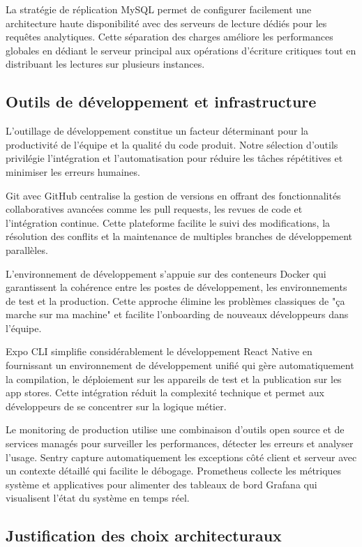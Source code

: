 La stratégie de réplication MySQL permet de configurer facilement une architecture haute disponibilité avec des serveurs de lecture dédiés pour les requêtes analytiques. Cette séparation des charges améliore les performances globales en dédiant le serveur principal aux opérations d'écriture critiques tout en distribuant les lectures sur plusieurs instances.

\subsection{Outils de développement et infrastructure}

L'outillage de développement constitue un facteur déterminant pour la productivité de l'équipe et la qualité du code produit. Notre sélection d'outils privilégie l'intégration et l'automatisation pour réduire les tâches répétitives et minimiser les erreurs humaines.

Git avec GitHub centralise la gestion de versions en offrant des fonctionnalités collaboratives avancées comme les pull requests, les revues de code et l'intégration continue. Cette plateforme facilite le suivi des modifications, la résolution des conflits et la maintenance de multiples branches de développement parallèles.

L'environnement de développement s'appuie sur des conteneurs Docker qui garantissent la cohérence entre les postes de développement, les environnements de test et la production. Cette approche élimine les problèmes classiques de "ça marche sur ma machine" et facilite l'onboarding de nouveaux développeurs dans l'équipe.

Expo CLI simplifie considérablement le développement React Native en fournissant un environnement de développement unifié qui gère automatiquement la compilation, le déploiement sur les appareils de test et la publication sur les app stores. Cette intégration réduit la complexité technique et permet aux développeurs de se concentrer sur la logique métier.

Le monitoring de production utilise une combinaison d'outils open source et de services managés pour surveiller les performances, détecter les erreurs et analyser l'usage. Sentry capture automatiquement les exceptions côté client et serveur avec un contexte détaillé qui facilite le débogage. Prometheus collecte les métriques système et applicatives pour alimenter des tableaux de bord Grafana qui visualisent l'état du système en temps réel.

\subsection{Justification des choix architecturaux}

